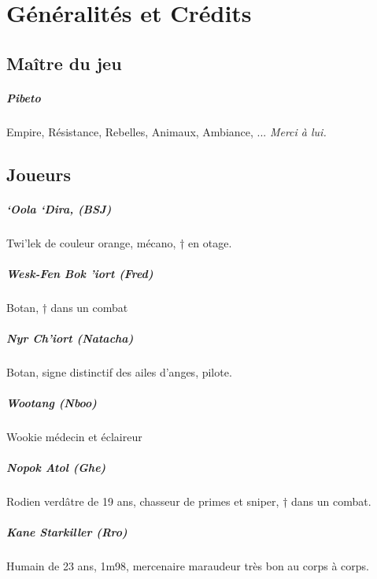 \documentclass[a4paper,9pt,twoside,twocolumn,openany]{book}
\begin{document}





\chapter{Généralités et Crédits}

\section{Maître du jeu}

\paragraph{Pibeto} Empire, Résistance, Rebelles, Animaux, Ambiance, ... \emph{Merci à lui.}

\section{Joueurs}

\paragraph{`Oola `Dira, (BSJ)} Twi’lek de couleur orange, mécano, † en otage.
\paragraph{Wesk-Fen Bok 'iort (Fred)} Botan, † dans un combat
\paragraph{Nyr Ch'iort (Natacha)} Botan, signe distinctif des ailes d’anges, pilote.
\paragraph{Wootang (Nboo)} Wookie médecin et éclaireur
\paragraph{Nopok Atol (Ghe)} Rodien verdâtre de 19 ans, chasseur de primes et sniper, † dans un combat.
\paragraph{Kane Starkiller (Rro)} Humain de 23 ans, 1m98, mercenaire maraudeur très bon au corps à corps.
\end{document}
